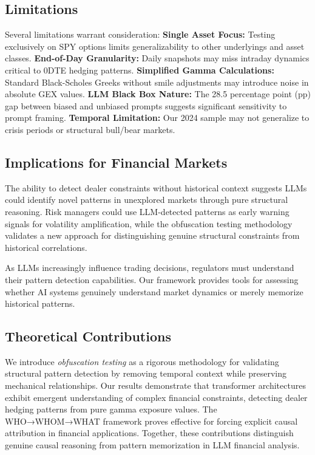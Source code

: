\subsection{Limitations}
Several limitations warrant consideration:
\textbf{Single Asset Focus:} Testing exclusively on SPY options limits generalizability to other underlyings and asset classes.
\textbf{End-of-Day Granularity:} Daily snapshots may miss intraday dynamics critical to 0DTE hedging patterns.
\textbf{Simplified Gamma Calculations:} Standard Black-Scholes Greeks without smile adjustments may introduce noise in absolute GEX values.
\textbf{LLM Black Box Nature:} The 28.5 percentage point (pp) gap between biased and unbiased prompts suggests significant sensitivity to prompt framing.
\textbf{Temporal Limitation:} Our 2024 sample may not generalize to crisis periods or structural bull/bear markets.

\subsection{Implications for Financial Markets}
The ability to detect dealer constraints without historical context suggests LLMs could identify novel patterns in unexplored markets through pure structural reasoning. Risk managers could use LLM-detected patterns as early warning signals for volatility amplification, while the obfuscation testing methodology validates a new approach for distinguishing genuine structural constraints from historical correlations.

As LLMs increasingly influence trading decisions, regulators must understand their pattern detection capabilities. Our framework provides tools for assessing whether AI systems genuinely understand market dynamics or merely memorize historical patterns.

\subsection{Theoretical Contributions}

We introduce \textit{obfuscation testing} as a rigorous methodology for validating structural pattern detection by removing temporal context while preserving mechanical relationships. Our results demonstrate that transformer architectures exhibit emergent understanding of complex financial constraints, detecting dealer hedging patterns from pure gamma exposure values. The WHO→WHOM→WHAT framework proves effective for forcing explicit causal attribution in financial applications. Together, these contributions distinguish genuine causal reasoning from pattern memorization in LLM financial analysis.

